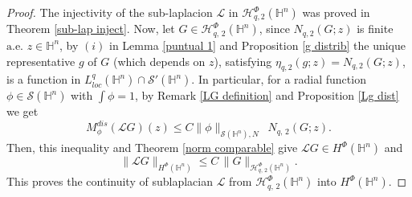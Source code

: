 \documentclass[oneside,10pt]{article}
\begin{document}
\begin{proof} The injectivity of the sub-laplacion $\mathcal{L}$ in $\mathcal{H}^{\Phi}_{q, 2}(\mathbb{H}^{n})$ was proved in 
Theorem \ref{sub-lap inject}. Now, let $G \in \mathcal{H}^{\Phi}_{q, \, 2}(\mathbb{H}^{n})$, since $N_{q, 2}(G; z)$ is finite 
$\text{a.e.} \,\, z \in \mathbb{H}^{n}$, by $(i)$ in Lemma \ref{puntual 1} and Proposition \ref{g distrib} the unique 
representative $g$ of $G$ (which depends on $z$), satisfying $\eta_{q, 2}(g; z) = N_{q, 2}(G; z)$, is a function in 
$L^{q}_{loc}(\mathbb{H}^{n}) \cap \mathcal{S}'(\mathbb{H}^{n})$. In particular, for a radial function $\phi \in \mathcal{S}(\mathbb{H}^n)$ with $\int \phi = 1$, by Remark \ref{LG definition} and Proposition \ref{Lg dist} we get
\[
M_{\phi}^{dis}(\mathcal{L}G)(z) \leq C \| \phi \|_{\mathcal{S}(\mathbb{H}^{n}), N}  \,\,\, N_{q, \, 2}(G; z).
\]
Then, this inequality and Theorem \ref{norm comparable} give $\mathcal{L}G \in H^{\Phi}(\mathbb{H}^{n})$ and 
\begin{equation} \label{continuity}
\| \mathcal{L}G \|_{H^{\Phi}(\mathbb{H}^{n})} \leq C \, \| G \|_{\mathcal{H}^{\Phi}_{q, \, 2}(\mathbb{H}^{n})}.
\end{equation}
This proves the continuity of sublaplacian $\mathcal{L}$ from $\mathcal{H}^{\Phi}_{q, \, 2}(\mathbb{H}^{n})$ into $H^{\Phi}(\mathbb{H}^{n})$.


\end{proof}
\end{document}
